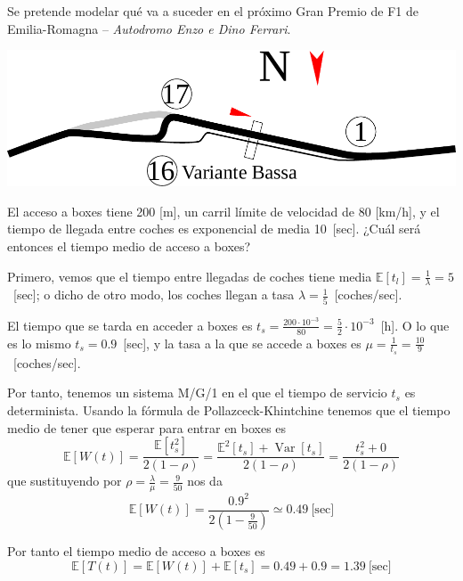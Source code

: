 \documentclass{upmassignment}
\date{\today}
\DeclareMathOperator{\Var}{Var}
\begin{document}
Se pretende modelar qué va a suceder en
el próximo Gran Premio de F1 de
Emilia-Romagna --
\textit{Autodromo Enzo e Dino Ferrari}.

\vspace{1em}

\begin{minipage}{\textwidth}
    \centering
    \includegraphics[width=.32\textwidth]{figs/box-pitlane.pdf}
\end{minipage}

\begin{problemlist}
    \pbitem El acceso a boxes tiene
    200 [m], un carril
    límite de velocidad de
    80 [km/h], y el tiempo de llegada
    entre coches es exponencial de media
    10~[sec]. ¿Cuál será entonces el tiempo
    medio de acceso a boxes?

    \begin{solucion}
        Primero, vemos que el tiempo entre llegadas
de coches
tiene media $\mathbb{E}[t_l]=\tfrac{1}{\lambda}=5$~[sec];
o dicho de otro modo, los coches llegan
a tasa $\lambda=\tfrac{1}{5}$~[coches/sec].

El tiempo que se tarda en acceder a boxes es
$t_s=\tfrac{200\cdot10^{-3}}{80}=\tfrac{5}{2}\cdot10^{-3}$~[h].
O lo que es lo mismo
$t_s=0.9$~[sec], y la tasa a la que
se accede a boxes es
$\mu=\tfrac{1}{t_s}=\tfrac{10}{9}$~[coches/sec].

Por tanto, tenemos un sistema M/G/1 en el que
el tiempo de servicio $t_s$ es determinista.
Usando la fórmula de Pollazceck-Khintchine
tenemos que el tiempo medio de tener que
esperar para entrar en boxes es
\begin{equation*}
    \mathbb{E}[W(t)]
    =\frac{\mathbb{E}[t_s^2]}{2(1-\rho)}
    =\frac{\mathbb{E}^2[t_s]+\Var[t_s]}{2(1-\rho)}
    =\frac{t_s^2+0}{2(1-\rho)}
\end{equation*}
que sustituyendo por
$\rho=\tfrac{\lambda}{\mu}=\tfrac{9}{50}$
nos da
\begin{equation*}
    \mathbb{E}[W(t)]=
    \frac{0.9^2}{2\left(1-\frac{9}{50}\right)}
    \simeq0.49~\text{[sec]}
\end{equation*}

Por tanto el tiempo medio de acceso a boxes es
\begin{equation*}
    \mathbb{E}[T(t)] = \mathbb{E}[W(t)]+
    \mathbb{E}[t_s]
    = 0.49 + 0.9 = 1.39~\text{[sec]}
\end{equation*}




\end{solucion}
\end{problemlist}
\end{document}
